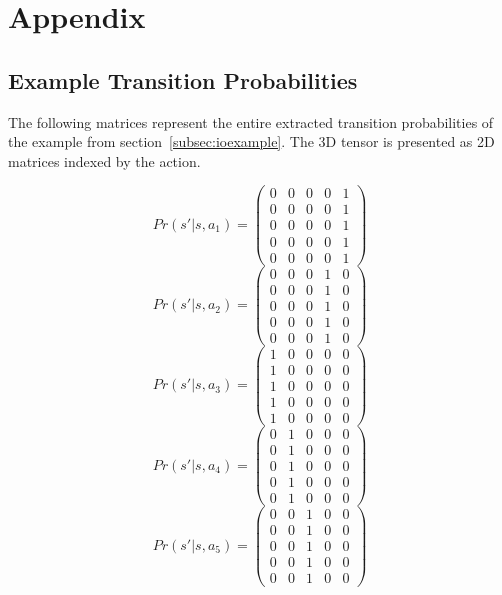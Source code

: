 \chapter{Appendix}


\section{Example Transition Probabilities}
\label{app:tpas}

The following matrices represent the entire extracted transition probabilities of the example from section~\ref{subsec:ioexample}. The 3D tensor is presented as 2D matrices indexed by the action.

\[
Pr(s'|s,a_1) = 
\begin{pmatrix}
 0 & 0 & 0 & 0 & 1 \\
 0 & 0 & 0 & 0 & 1 \\
 0 & 0 & 0 & 0 & 1 \\
 0 & 0 & 0 & 0 & 1 \\
 0 & 0 & 0 & 0 & 1
\end{pmatrix}
\]
\[
Pr(s'|s,a_2) = 
\begin{pmatrix}
 0 & 0 & 0 & 1 & 0 \\
 0 & 0 & 0 & 1 & 0 \\
 0 & 0 & 0 & 1 & 0 \\
 0 & 0 & 0 & 1 & 0 \\
 0 & 0 & 0 & 1 & 0
\end{pmatrix}
\]
\[
Pr(s'|s,a_3) = 
\begin{pmatrix}
 1 & 0 & 0 & 0 & 0 \\
 1 & 0 & 0 & 0 & 0 \\
 1 & 0 & 0 & 0 & 0 \\
 1 & 0 & 0 & 0 & 0 \\
 1 & 0 & 0 & 0 & 0
\end{pmatrix}
\]
\[
Pr(s'|s,a_4) = 
\begin{pmatrix}
 0 & 1 & 0 & 0 & 0 \\
 0 & 1 & 0 & 0 & 0 \\
 0 & 1 & 0 & 0 & 0 \\
 0 & 1 & 0 & 0 & 0 \\
 0 & 1 & 0 & 0 & 0
\end{pmatrix}
\]
\[
Pr(s'|s,a_5) = 
\begin{pmatrix}
 0 & 0 & 1 & 0 & 0 \\
 0 & 0 & 1 & 0 & 0 \\
 0 & 0 & 1 & 0 & 0 \\
 0 & 0 & 1 & 0 & 0 \\
 0 & 0 & 1 & 0 & 0
\end{pmatrix}
\]


